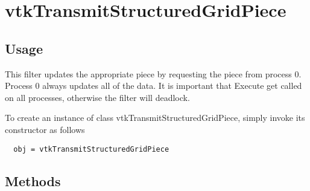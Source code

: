 \section{vtkTransmitStructuredGridPiece}

\subsection{Usage}

 This filter updates the appropriate piece by requesting the piece from 
 process 0.  Process 0 always updates all of the data.  It is important that 
 Execute get called on all processes, otherwise the filter will deadlock.

To create an instance of class vtkTransmitStructuredGridPiece, simply
invoke its constructor as follows
\begin{verbatim}
  obj = vtkTransmitStructuredGridPiece
\end{verbatim}
\subsection{Methods}

